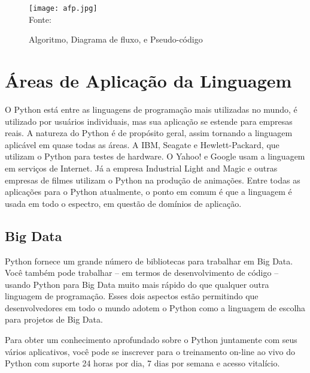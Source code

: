   \begin{figure}[H]
    \begin{center}
        \caption{Algoritmo, Diagrama de fluxo, e Pseudo-código} \label{afp}
        \texttt{[image: afp.jpg]} \\
        {\tiny \sf Fonte: \cite[p. 93]{Sprankle2012} }
    \end{center}
   \end{figure}

   \section{Áreas de Aplicação da Linguagem}
   O Python está entre as linguagens de programação mais utilizadas no mundo, é utilizado por usuários individuais, mas sua aplicação se estende para empresas reais. A natureza do Python é de propósito geral, assim tornando a linguagem aplicável em quase todas as áreas. A IBM, Seagate e Hewlett-Packard, que utilizam o Python para testes de hardware. O Yahoo! e Google usam a linguagem em serviços de Internet. Já a empresa Industrial Light and Magic e outras empresas de filmes utilizam o Python na produção de animações. Entre todas as aplicações para o Python atualmente, o ponto em comum é que a linguagem é usada em todo o espectro, em questão de domínios de aplicação. \cite{Lutz2007}

        \subsection{Big Data}
        Python fornece um grande número de bibliotecas para trabalhar em Big Data. Você também pode trabalhar – em termos de desenvolvimento de código – usando Python para Big Data muito mais rápido do que qualquer outra linguagem de programação. Esses dois aspectos estão permitindo que desenvolvedores em todo o mundo adotem o Python como a linguagem de escolha para projetos de Big Data. 
        
        Para obter um conhecimento aprofundado sobre o Python juntamente com seus vários aplicativos, você pode se inscrever para o treinamento on-line ao vivo do Python com suporte 24 horas por dia, 7 dias por semana e acesso vitalício.
        
